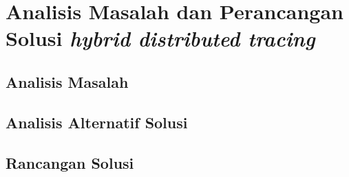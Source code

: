 \chapter{Analisis Masalah dan Perancangan Solusi \textit{hybrid distributed tracing}}



\section{Analisis Masalah}


\section{Analisis Alternatif Solusi}

\section{Rancangan Solusi}